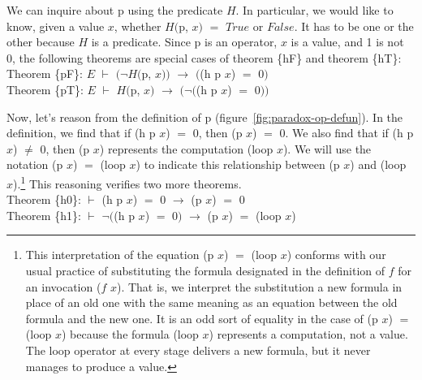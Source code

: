 We can inquire about \textsf{p} using the predicate $H$.
In particular, we would like to know, given a value $x$,
whether $H($\textsf{p}, $x)$ $=$ $True$ or $False$.
It has to be one or the other because $H$ is a predicate.
Since \textsf{p} is an operator, $x$ is a value, and 1 is not 0,
the following theorems are special cases of
theorem \{hF\} and theorem \{hT\}:
\vspace{2mm}\\
\hspace*{5mm}Theorem \{pF\}: $E$ $\vdash$ $(\neg H($\textsf{p}, $x))$ $\rightarrow$ $($\textsf{(h p $x$)} $=$ \textsf{0}$)$ \\
\hspace*{5mm}Theorem \{pT\}: $E$ $\vdash$ $H($\textsf{p}, $x)$ $\rightarrow$ $(\neg($\textsf{(h p $x$)} $=$ \textsf{0}$))$
\vspace{2mm}

Now, let's reason from the definition of
\textsf{p} (figure~\ref{fig:paradox-op-defun}).
In the definition, we find that if \textsf{(h p $x$)} $=$ \textsf{0},
then \textsf{(p $x$)} $=$ \textsf{0}.
We also find that if \textsf{(h p $x$)} $\neq$ \textsf{0},
then \textsf{(p $x$)} represents
the computation \textsf{(loop $x$)}.
We will use the notation \textsf{(p $x$)} $=$ \textsf{(loop $x$)}
to indicate this relationship between \textsf{(p $x$)} and \textsf{(loop $x$)}.\footnote{This
\label{caveat:equality-for-loop}
interpretation of the equation \textsf{(p $x$)} $=$ \textsf{(loop $x$)} conforms with
our usual practice of substituting the formula designated in the
definition of $f$ for an invocation \textsf{($f$ $x$)}.
That is, we interpret the substitution a new formula
in place of an old one with the same meaning as an equation
between the old formula and the new one.
It is an odd sort of equality in the case of \textsf{(p $x$)} $=$ \textsf{(loop $x$)}
because the formula \textsf{(loop $x$)} represents a computation,
not a value.
The \textsf{loop} operator at every stage delivers a new formula,
but it never manages to produce a value.}
This reasoning verifies two more theorems.
\vspace{2mm}\\
\hspace*{5mm}Theorem \{h0\}: $\vdash$  \textsf{(h p $x$)} $=$ \textsf{0}  $\rightarrow$ \textsf{(p $x$)} $=$ \textsf{0}    \\
\hspace*{5mm}Theorem \{h1\}: $\vdash$  $\neg($\textsf{(h p $x$)} $=$ \textsf{0}$)$ $\rightarrow$ \textsf{(p $x$)} $=$ \textsf{(loop $x$)}
\vspace{2mm}

